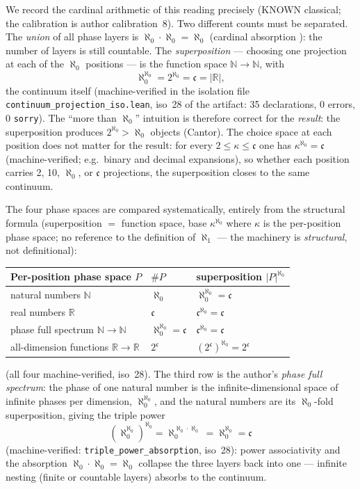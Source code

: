 \documentclass{article}
\begin{document}
We record the cardinal arithmetic of this reading precisely (KNOWN
classical; the calibration is author calibration~8). Two different
counts must be separated. The \emph{union} of all phase layers is
$\aleph_0\cdot\aleph_0=\aleph_0$ (cardinal absorption \cite{halmos}): the number of
layers is still countable. The \emph{superposition} --- choosing one
projection at each of the $\aleph_0$ positions --- is the function space
$\mathbb{N}\to\mathbb{N}$, with
\[
\aleph_0^{\aleph_0}=2^{\aleph_0}=\mathfrak c=|\mathbb{R}|,
\]
the continuum itself (machine-verified in the isolation file
\texttt{continuum\_projection\_iso.lean}, iso~28 of the artifact: 35
declarations, 0 errors, 0 \texttt{sorry}). The ``more than $\aleph_0$''
intuition is therefore correct for the \emph{result}: the superposition
produces $2^{\aleph_0}>\aleph_0$ objects (Cantor). The choice space at
each position does not matter for the result: for every
$2\le\kappa\le\mathfrak c$ one has $\kappa^{\aleph_0}=\mathfrak c$
(machine-verified; e.g.\ binary and decimal expansions), so whether each
position carries 2, 10, $\aleph_0$, or $\mathfrak c$ projections, the
superposition closes to the same continuum.

The four phase spaces are compared systematically, entirely from the
structural formula (superposition $=$ function space, base
$\kappa^{\aleph_0}$ where $\kappa$ is the per-position phase space; no
reference to the definition of $\aleph_1$ --- the machinery is
\emph{structural}, not definitional):

\begin{center}
\small
\begin{tabular}{lll}
\hline
Per-position phase space $P$ & $\#P$ & superposition $|P|^{\aleph_0}$ \\
\hline
natural numbers $\mathbb N$ & $\aleph_0$ & $\aleph_0^{\aleph_0}=\mathfrak c$ \\
real numbers $\mathbb R$ & $\mathfrak c$ & $\mathfrak c^{\aleph_0}=\mathfrak c$ \\
phase full spectrum $\mathbb N\to\mathbb N$ &
$\aleph_0^{\aleph_0}=\mathfrak c$ & $\mathfrak c^{\aleph_0}=\mathfrak c$ \\
all-dimension functions $\mathbb R\to\mathbb R$ & $2^{\mathfrak c}$ &
$(2^{\mathfrak c})^{\aleph_0}=2^{\mathfrak c}$ \\
\hline
\end{tabular}
\end{center}

(all four machine-verified, iso~28). The third row is the author's
\emph{phase full spectrum}: the phase of one natural number is the
infinite-dimensional space of infinite phases per dimension,
$\aleph_0^{\aleph_0}$, and the natural numbers are its
$\aleph_0$-fold superposition, giving the triple power
\[
(\aleph_0^{\aleph_0})^{\aleph_0}
=\aleph_0^{\aleph_0\cdot\aleph_0}
=\aleph_0^{\aleph_0}
=\mathfrak c
\]
(machine-verified: \texttt{triple\_power\_absorption}, iso~28): power
associativity and the absorption $\aleph_0\cdot\aleph_0=\aleph_0$
collapse the three layers back into one --- infinite nesting (finite or
countable layers) absorbs to the continuum.
\end{document}
